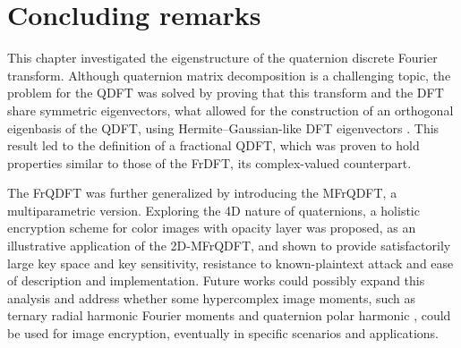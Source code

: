 \section{Concluding remarks}
\label{sec:conclusao}
This chapter investigated the eigenstructure of the quaternion discrete Fourier transform. Although quaternion matrix decomposition is a challenging topic, the problem for the QDFT was solved by proving that this transform and the DFT share symmetric eigenvectors, what allowed for the construction of an orthogonal eigenbasis of the QDFT, using Hermite--Gaussian-like DFT eigenvectors \cite{de2017discrete}. This result led to the definition of a fractional QDFT, which was proven to hold properties similar to those of the FrDFT, its complex-valued counterpart.

The FrQDFT was further generalized by introducing the MFrQDFT, a multiparametric version. Exploring the 4D nature of quaternions, a holistic encryption scheme for color images with opacity layer was proposed, as an illustrative application of the 2D-MFrQDFT, and shown to provide satisfactorily large key space and key sensitivity, resistance to known-plaintext attack and ease of description and implementation. Future works could possibly expand this analysis and address whether some hypercomplex image moments, such as ternary radial harmonic Fourier moments and quaternion polar harmonic \cite{wang2019ternary,wang2018quaternion}, could be used for image encryption, eventually in specific scenarios and applications.
